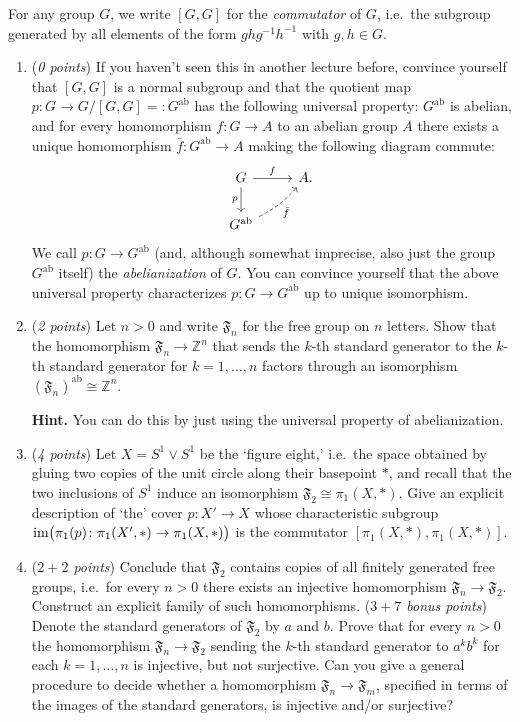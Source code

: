 \begin{sheetexercise}
For any group $G$, we write $[G,G]$ for the \emph{commutator} of $G$, i.e.~the subgroup generated by all elements of the form $ghg^{-1}h^{-1}$ with $g,h\in G$.
\begin{enumerate}
\item (\textit{0 points}) If you haven't seen this in another lecture before, convince yourself that $[G,G]$ is a normal subgroup and that the quotient map $p\colon G\to G/[G,G]\mathrel{=:} G^{\text{ab}}$ has the following universal property: $G^{\text{ab}}$ is abelian, and for every homomorphism $f\colon G\to A$ to an abelian group $A$ there exists a unique homomorphism $\bar{f}\colon G^{\text{ab}}\to A$ making the following diagram commute:
\begin{equation*}
\begin{tikzcd}
G\arrow[d, "p"'] \arrow[r,"f"] & A.\\
G^{\text{ab}}\arrow[ur, dashed, "\bar f"', bend right=10pt]
\end{tikzcd}
\end{equation*}
We call $p\colon G\to G^{\text{ab}}$ (and, although somewhat imprecise, also just the group $G^{\text{ab}}$ itself) the \emph{abelianization} of $G$. You can convince yourself that the above universal property characterizes $p\colon G\to G^{\text{ab}}$ up to unique isomorphism.
\item (\textit{2 points}) Let $n> 0$ and write $\mathfrak F_n$ for the free group on $n$ letters. Show that the homomorphism $\mathfrak F_n\to\mathbb Z^n$ that sends the $k$-th standard generator to the $k$-th standard generator for $k=1,\dots,n$ factors through an isomorphism $(\mathfrak F_n)^{\text{ab}}\cong\mathbb Z^n$.

\textbf{Hint.} You can do this by just using the universal property of abelianization.
\item (\textit{4 points}) Let $X=S^1\vee S^1$ be the `figure eight,' i.e.~the space obtained by gluing two copies of the unit circle along their basepoint $*$, and recall that the two inclusions of $S^1$ induce an isomorphism $\mathfrak F_2\cong\pi_1(X,*)$. Give an explicit description of `the' cover $p\colon X'\to X$ whose characteristic subgroup $\textup{im}\big(\pi_1(p)\colon \pi_1(X',*)\to\pi_1(X,*)\big)$ is the commutator $[\pi_1(X,*),\pi_1(X,*)]$.
\item (\textit{$2+2$ points}) Conclude that $\mathfrak F_2$ contains copies of all finitely generated free groups, i.e.~for every $n>0$ there exists an injective homomorphism $\mathfrak F_n\to\mathfrak F_2$. Construct an explicit family of such homomorphisms.
\staritem (\textit{$3+7$ bonus points}) Denote the standard generators of $\mathfrak F_2$ by $a$ and $b$. Prove that for every $n>0$ the homomorphism $\mathfrak F_n\to\mathfrak F_2$ sending the $k$-th standard generator to $a^kb^k$ for each $k=1,\dots,n$ is injective, but not surjective. Can you give a general procedure to decide whether a homomorphism $\mathfrak F_n\to\mathfrak F_m$, specified in terms of the images of the standard generators, is injective and/or surjective?
\end{enumerate}
\end{sheetexercise}

